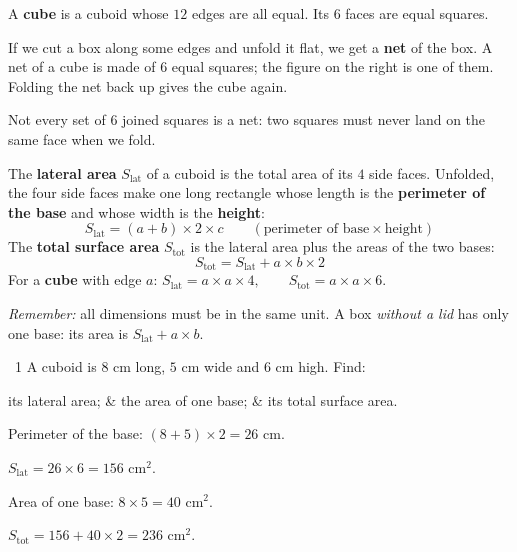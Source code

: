 \begin{knowbox}
\begin{minipage}[t]{0.56\linewidth}
A \textbf{cube} is a cuboid whose $12$ edges are all equal. Its $6$ faces are equal squares.\par
\smallskip
If we cut a box along some edges and unfold it flat, we get a \textbf{net} of the box. A net of a cube is made of $6$ equal squares; the figure on the right is one of them. Folding the net back up gives the cube again.\par
\smallskip
Not every set of $6$ joined squares is a net: two squares must never land on the same face when we fold.
\end{minipage}\hfill
\begin{minipage}[t]{0.4\linewidth}\vspace{2pt}\centering
{}\qquad
{}
\end{minipage}
\end{knowbox}
\begin{knowbox}
The \textbf{lateral area} $S_{\text{lat}}$ of a cuboid is the total area of its $4$ side faces. Unfolded, the four side faces make one long rectangle whose length is the \textbf{perimeter of the base} and whose width is the \textbf{height}:
\[S_{\text{lat}}=(a+b)\times2\times c\qquad(\text{perimeter of base}\times\text{height})\]
The \textbf{total surface area} $S_{\text{tot}}$ is the lateral area plus the areas of the two bases:
\[S_{\text{tot}}=S_{\text{lat}}+a\times b\times2\]
For a \textbf{cube} with edge $a$: \quad $S_{\text{lat}}=a\times a\times4,\qquad S_{\text{tot}}=a\times a\times6.$\par
\smallskip
\emph{Remember:} all dimensions must be in the same unit. A box \emph{without a lid} has only one base: its area is $S_{\text{lat}}+a\times b$.
\end{knowbox}
\gap
\begin{exbox}{\ExWord\ 1}
A cuboid is $8$ cm long, $5$ cm wide and $6$ cm high. Find:
\begin{cols3}
 its lateral area; &  the area of one base; &  its total surface area.
\end{cols3}
\guide
{} Perimeter of the base: $(8+5)\times2=26$ cm.\par $S_{\text{lat}}=26\times6=156$ cm$^2$.\par
{} Area of one base: $8\times5=40$ cm$^2$.\par
{} $S_{\text{tot}}=156+40\times2=236$ cm$^2$.
\end{exbox}

